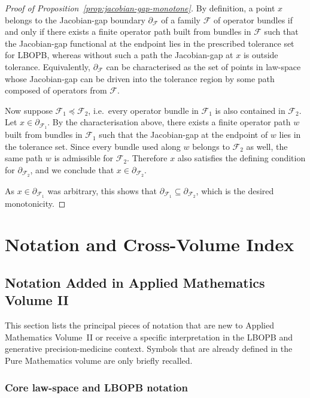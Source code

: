 \documentclass[11pt]{book}
\theoremstyle{plain}
\theoremstyle{definition}
\theoremstyle{remark}
\begin{document}
\begin{proof}[Proof of Proposition~\ref{prop:jacobian-gap-monotone}]
By definition, a point $x$ belongs to the Jacobian-gap boundary
$\partial_{\mathcal{F}}$ of a family $\mathcal{F}$ of operator bundles
if and only if there exists a finite operator path built from bundles
in $\mathcal{F}$ such that the Jacobian-gap functional at the endpoint
lies in the prescribed tolerance set for LBOPB, whereas without such
a path the Jacobian-gap at $x$ is outside tolerance. Equivalently,
$\partial_{\mathcal{F}}$ can be characterised as the set of points in
law-space whose Jacobian-gap can be driven into the tolerance region by
some path composed of operators from $\mathcal{F}$.

Now suppose $\mathcal{F}_{1} \preceq \mathcal{F}_{2}$, i.e.\ every
operator bundle in $\mathcal{F}_{1}$ is also contained in
$\mathcal{F}_{2}$. Let $x \in \partial_{\mathcal{F}_{1}}$. By the
characterisation above, there exists a finite operator path $w$ built
from bundles in $\mathcal{F}_{1}$ such that the Jacobian-gap at the
endpoint of $w$ lies in the tolerance set. Since every bundle used
along $w$ belongs to $\mathcal{F}_{2}$ as well, the same path $w$ is
admissible for $\mathcal{F}_{2}$. Therefore $x$ also satisfies the
defining condition for $\partial_{\mathcal{F}_{2}}$, and we conclude
that $x \in \partial_{\mathcal{F}_{2}}$.

As $x \in \partial_{\mathcal{F}_{1}}$ was arbitrary, this shows that
$\partial_{\mathcal{F}_{1}} \subseteq \partial_{\mathcal{F}_{2}}$, which
is the desired monotonicity.
\end{proof}

\chapter{Notation and Cross-Volume Index}


\section{Notation Added in Applied Mathematics Volume II}


This section lists the principal pieces of notation that are new to
Applied Mathematics Volume~II or receive a specific interpretation in
the LBOPB and generative precision-medicine context. Symbols that are
already defined in the Pure Mathematics volume are only briefly
recalled.

\subsection*{Core law-space and LBOPB notation}
\end{document}
